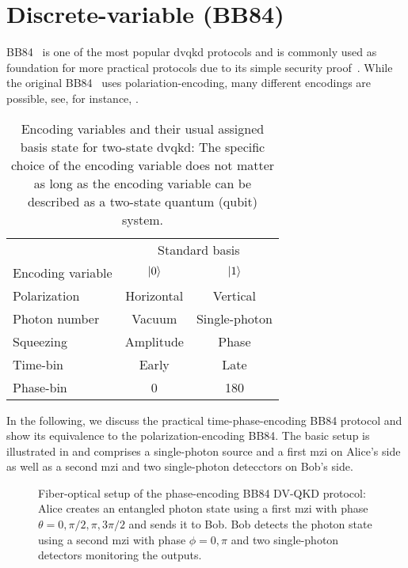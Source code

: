 \section{Discrete-variable (BB84)}

BB84~\cite{Bennett1984} is one of the most popular \gls{dvqkd} protocols and is commonly used as foundation for more practical protocols due to its simple security proof~\cite{Shor2000}.
While the original BB84~\cite{Bennett1984} uses polariation-encoding, many different encodings are possible, see, for instance, .
\begin{table}[htb]
	\centering	
	\begin{tabular}{lcc}
		\toprule
		& \multicolumn{2}{c}{Standard basis} \\
		\cmidrule{2-3}
		Encoding variable & $\ket{0}$ & $\ket{1}$ \\
		\midrule
		Polarization & Horizontal & Vertical \\
		Photon number & Vacuum & Single-photon \\
		Squeezing & Amplitude & Phase \\
		Time-bin & Early & Late \\
		Phase-bin & \SI{0}{\deg} & \SI{180}{\deg} \\
		\bottomrule
	\end{tabular}
	\caption{Encoding variables and their usual assigned basis state for two-state \gls{dvqkd}: The specific choice of the encoding variable does not matter as long as the encoding variable can be described as a two-state quantum (qubit) system.}\label{tab:dvqkd_encodings}
\end{table}
In the following, we discuss the practical time-phase-encoding BB84 protocol and show its equivalence to the polarization-encoding BB84.
The basic setup is illustrated in  and comprises a single-photon source and a first \gls{mzi} on Alice's side as well as a second \gls{mzi} and two single-photon detecctors on Bob's side.
\begin{figure}[htb]
	\centering
	
	\caption{Fiber-optical setup of the phase-encoding BB84 DV-QKD protocol: Alice creates an entangled photon state using a first \gls{mzi} with phase $\theta=0,\pi/2,\pi,3\pi/2$ and sends it to Bob. Bob detects the photon state using a second \gls{mzi} with phase $\phi=0,\pi$ and two single-photon detectors monitoring the outputs.}\label{fig:time_phase_encoding_bb84}
\end{figure}
